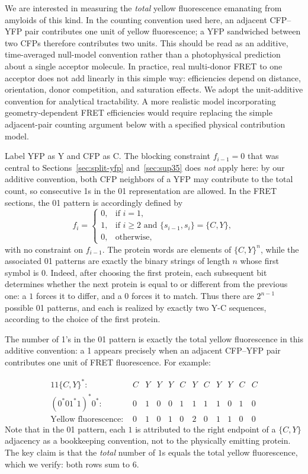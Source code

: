 \documentclass[referee,lineno,pdflatex,sn-mathphys-ay]{sn-jnl}
\begin{document}
We are interested in measuring the \textit{total} yellow fluorescence emanating from amyloids of this kind. In the counting convention used here, an adjacent CFP--YFP pair contributes one unit of yellow fluorescence; a YFP sandwiched between two CFPs therefore contributes two units. This should be read as an additive, time-averaged null-model convention rather than a photophysical prediction about a single acceptor molecule. In practice, real multi-donor FRET to one acceptor does not add linearly in this simple way: efficiencies depend on distance, orientation, donor competition, and saturation effects. We adopt the unit-additive convention for analytical tractability. A more realistic model incorporating geometry-dependent FRET efficiencies would require replacing the simple adjacent-pair counting argument below with a specified physical contribution model.

Label YFP as Y and CFP as C. The blocking constraint $f_{i-1} = 0$ that was central to Sections~\ref{sec:split-yfp} and~\ref{sec:sup35} does \emph{not} apply here: by our additive convention, both CFP neighbors of a YFP may contribute to the total count, so consecutive 1s in the 01 representation are allowed. In the FRET sections, the 01 pattern is accordingly defined by
\[
f_i = \begin{cases}
0, & \text{if } i = 1, \\
1, & \text{if } i \ge 2 \text{ and } \{s_{i-1}, s_i\} = \{C, Y\}, \\
0, & \text{otherwise,}
\end{cases}
\]
with no constraint on $f_{i-1}$. The protein words are elements of $\{C,Y\}^n$, while the associated 01 patterns are exactly the binary strings of length $n$ whose first symbol is $0$. Indeed, after choosing the first protein, each subsequent bit determines whether the next protein is equal to or different from the previous one: a $1$ forces it to differ, and a $0$ forces it to match. Thus there are $2^{n-1}$ possible 01 patterns, and each is realized by exactly two Y-C sequences, according to the choice of the first protein.

The number of 1's in the 01 pattern is exactly the total yellow fluorescence in this additive convention: a 1 appears precisely when an adjacent CFP--YFP pair contributes one unit of FRET fluorescence. For example:

\begin{alignat*}{11}
\text{$\{C, Y \}^*$:  } & C & Y & Y & Y & C & Y & C & Y & Y & C  & C \\
\text{$(0^*0 1^* 1)^* 0^*$:  } & 0 & 1 & 0 & 0 & 1 & 1 & 1 & 1 & 0 & 1 & 0 \\
\text{Yellow fluorescence:  } & 0 & 1 & 0 & 1 & 0 & 2 & 0 & 1 & 1 & 0 & 0
\end{alignat*}
Note that in the 01 pattern, each $1$ is attributed to the right endpoint of a $\{C,Y\}$ adjacency as a bookkeeping convention, not to the physically emitting protein. The key claim is that the \textit{total} number of $1$s equals the total yellow fluorescence, which we verify: both rows sum to $6$.
\end{document}

